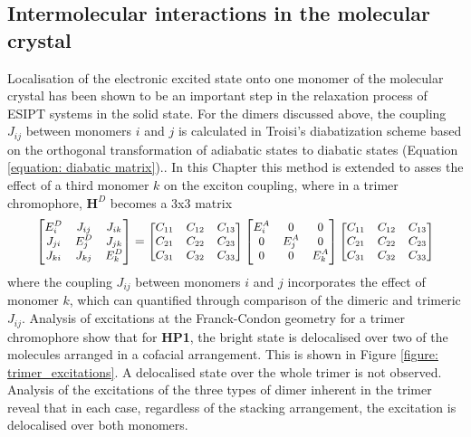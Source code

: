 \subsection{Intermolecular interactions in the molecular crystal}\label{section: Connecting_Interactions}

Localisation of the electronic excited state onto one monomer of the molecular crystal has been shown to be an important step in the relaxation process of ESIPT systems in the solid state. For the dimers discussed above, the coupling $J_{ij}$ between monomers $i$ and $j$ is calculated in Troisi's diabatization scheme based on the orthogonal transformation of adiabatic states to diabatic states (Equation \ref{equation: diabatic matrix}).\cite{Arago2015,Fornari2016}. In this Chapter this method is extended to asses the effect of a third monomer $k$ on the exciton coupling, where in a trimer chromophore, $\textbf{H}^D$ becomes a 3x3 matrix
\begin{equation}
\small
\label{equation: 3x3 diabatic matrix}
\begin{bmatrix}
E_{i}^D & J_{ij} & J_{ik}\\
J_{ji} & E_{j}^D & J_{jk} \\
J_{ki} & J_{kj}& E_{k}^D
\end{bmatrix}
=
\begin{bmatrix}
C_{11} & C_{12} & C_{13}\\
C_{21} & C_{22} & C_{23}\\
C_{31} & C_{32} & C_{33}
\end{bmatrix}
\begin{bmatrix}
E_{i}^A & 0 & 0\\
0 & E_{j}^A & 0\\
0 & 0 & E_{k}^A\\
\end{bmatrix}
\begin{bmatrix}
C_{11} & C_{12} & C_{13}\\
C_{21} & C_{22} & C_{23}\\
C_{31} & C_{32} & C_{33}
\end{bmatrix}
\end{equation} 
where the coupling $J_{ij}$ between monomers $i$ and $j$ incorporates the effect of monomer $k$, which can quantified through comparison of the dimeric and trimeric $J_{ij}$. Analysis of excitations at the Franck-Condon geometry for a trimer chromophore show that for \textbf{HP1}, the bright state is delocalised over two of the molecules arranged in a cofacial arrangement. This is shown in Figure \ref{figure: trimer_excitations}. A delocalised state over the whole trimer is not observed. Analysis of the excitations of the three types of dimer inherent in the trimer reveal that in each case, regardless of the stacking arrangement, the excitation is delocalised over both monomers. 

